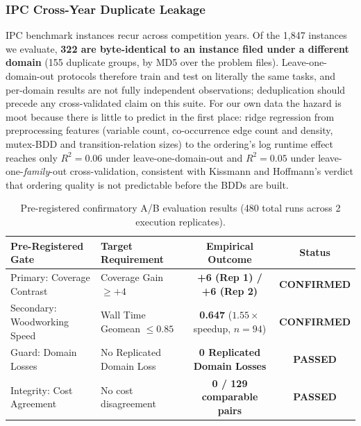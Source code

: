 \documentclass[twocolumn,10pt]{article}
\begin{document}
\subsubsection{IPC Cross-Year Duplicate Leakage}
IPC benchmark instances recur across competition years. Of the 1,847 instances we evaluate, \textbf{322 are byte-identical to an instance filed under a different domain} (155 duplicate groups, by MD5 over the problem files). Leave-one-domain-out protocols therefore train and test on literally the same tasks, and per-domain results are not fully independent observations; deduplication should precede any cross-validated claim on this suite. For our own data the hazard is moot because there is little to predict in the first place: ridge regression from preprocessing features (variable count, co-occurrence edge count and density, mutex-BDD and transition-relation sizes) to the ordering's log runtime effect reaches only $R^2 = 0.06$ under leave-one-domain-out and $R^2 = 0.05$ under leave-one-\textit{family}-out cross-validation, consistent with Kissmann and Hoffmann's verdict \cite{kissmann2014bdd} that ordering quality is not predictable before the BDDs are built.

\begin{table}[t]
\centering
\caption{Pre-registered confirmatory A/B evaluation results (480 total runs across 2 execution replicates).}
\label{tab:prereg_ab}
\small
\begin{tabular}{llcc}
\toprule
\textbf{Pre-Registered Gate} & \textbf{Target Requirement} & \textbf{Empirical Outcome} & \textbf{Status} \\
\midrule
Primary: Coverage Contrast & Coverage Gain $\ge +4$ & \textbf{+6 (Rep 1) / +6 (Rep 2)} & \textbf{CONFIRMED} \\
Secondary: Woodworking Speed & Wall Time Geomean $\le 0.85$ & \textbf{0.647} ($1.55\times$ speedup, $n=94$) & \textbf{CONFIRMED} \\
Guard: Domain Losses & No Replicated Domain Loss & \textbf{0 Replicated Domain Losses} & \textbf{PASSED} \\
Integrity: Cost Agreement & No cost disagreement & \textbf{0 / 129 comparable pairs} & \textbf{PASSED} \\
\bottomrule
\end{tabular}

\end{table}
\end{document}
